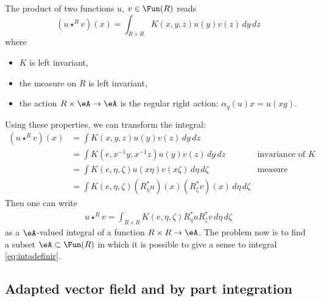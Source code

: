 The product of two functions $u$, $v\in\Fun(R)$ reads
\begin{equation}
(u\star^R v)(x)=\int_{R\times R} K(x,y,z)u(y)v(z)\,dy\,dz
\end{equation}
where

\begin{itemize}
\item $K$ is left invariant,
\item the measure on $R$ is left invariant,
\item the action $R\times\eA\to\eA$ is the regular right action: $\alpha_g(u)x=u(xg)$.
\end{itemize}
Using these properties, we can transform the integral:
\[ 
  \begin{aligned}
(u\star^R v)(x)&=\int K(x,y,z)u(y)v(z)\,dy\,dz\\
		&=\int K(e,x^{-1}y,x^{-1}z)u(y)v(z)\,dy\,dz		&\textrm{invariance of $K$}\\
		&=\int K(e,\eta,\zeta)u(x\eta)v(x\zeta)\,d\eta\,d\zeta	&\textrm{measure invariance}\\
		&=\int K(e,\eta,\zeta) (R^*_{\eta}u)(x) (R^*_{\zeta}v)(x)\,d\eta\,d\zeta
\end{aligned}
\]
Then one can write
\begin{equation}  \label{eq:intadefinir}
\begin{split}
u\star^R v=\int_{R\times R} K(e,\eta,\zeta)R^*_{\eta}u R^*_{\zeta}v\,d\eta\,d\zeta
\end{split}
\end{equation}
as a $\eA$-valued integral of a function $R\times R\to\eA$. The problem now is to find a subset $\eA\subset\Fun(R)$ in which it is possible to give a sense to integral \eqref{eq:intadefinir}. 

\subsection{Adapted vector field and by part integration}

